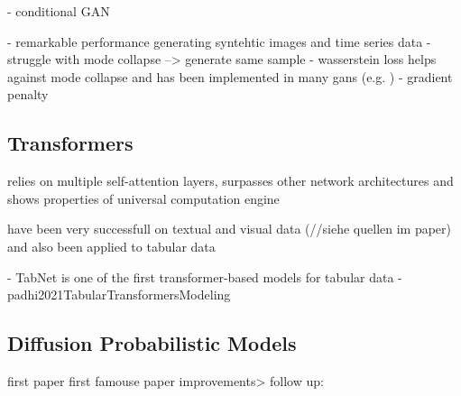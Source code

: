 - conditional GAN \cite{mirza2014ConditionalGenerativeAdversarial}


- remarkable performance generating syntehtic images and time series data \cite{mckeever2020SynthesisingTabularDatasets}
- struggle with mode collapse --> generate same sample \cite{torfi2020CorGANCorrelationCapturingConvolutionala}
- wasserstein loss helps against mode collapse \cite{frogner2015LearningWassersteinLoss} \cite{arjovsky2017WassersteinGenerativeAdversarial} and has been implemented in many gans (e.g. \cite{zhao2022CTABGANEnhancingTabular})
- gradient penalty \cite{gulrajani2017ImprovedTrainingWasserstein}


\subsection{Transformers}
\label{ch:preliminaries-generativeAlgorithms-transformers}
relies on multiple self-attention layers, surpasses other network architectures and shows properties of universal computation engine \cite{li2022TTSGANTransformerbasedTimeSeries}

have been very successfull on textual and visual data (//siehe quellen im paper) \cite{borisov2022DeepNeuralNetworks} and also been applied to tabular data \cite{padhi2021TabularTransformersModeling} \cite{gorishniy2022EmbeddingsNumericalFeatures}




- TabNet is one of the first transformer-based models for tabular data \cite{borisov2022DeepNeuralNetworks}
- padhi2021TabularTransformersModeling

\subsection{Diffusion Probabilistic Models}
\label{ch:preliminaries-generativeAlgorithms-diffusionProbabilisticModels}

first paper \cite{sohl-dickstein2015DeepUnsupervisedLearning}
first famouse paper \cite{ho2020DenoisingDiffusionProbabilistic}
improvements> \cite{nichol2021ImprovedDenoisingDiffusion}
follow up: \cite{dhariwal2021DiffusionModelsBeat}

\cite{ho2022ClassifierFreeDiffusionGuidance}

